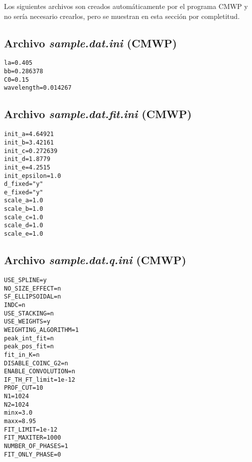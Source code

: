 Los siguientes archivos son creados automáticamente por el programa CMWP y no sería necesario crearlos, pero se muestran en esta sección por completitud.
\subsection{Archivo \textit{sample.dat.ini} (CMWP)}
\begin{lstlisting}
la=0.405
bb=0.286378
C0=0.15
wavelength=0.014267
\end{lstlisting}

\subsection{Archivo \textit{sample.dat.fit.ini} (CMWP)}
\begin{lstlisting}
init_a=4.64921
init_b=3.42161
init_c=0.272639
init_d=1.8779
init_e=4.2515
init_epsilon=1.0
d_fixed="y"
e_fixed="y"
scale_a=1.0
scale_b=1.0
scale_c=1.0
scale_d=1.0
scale_e=1.0
\end{lstlisting}

\subsection{Archivo \textit{sample.dat.q.ini} (CMWP)}
\begin{lstlisting}
USE_SPLINE=y
NO_SIZE_EFFECT=n
SF_ELLIPSOIDAL=n
INDC=n
USE_STACKING=n
USE_WEIGHTS=y
WEIGHTING_ALGORITHM=1
peak_int_fit=n
peak_pos_fit=n
fit_in_K=n
DISABLE_COINC_G2=n
ENABLE_CONVOLUTION=n
IF_TH_FT_limit=1e-12
PROF_CUT=10
N1=1024
N2=1024
minx=3.0
maxx=8.95
FIT_LIMIT=1e-12
FIT_MAXITER=1000
NUMBER_OF_PHASES=1
FIT_ONLY_PHASE=0
\end{lstlisting}